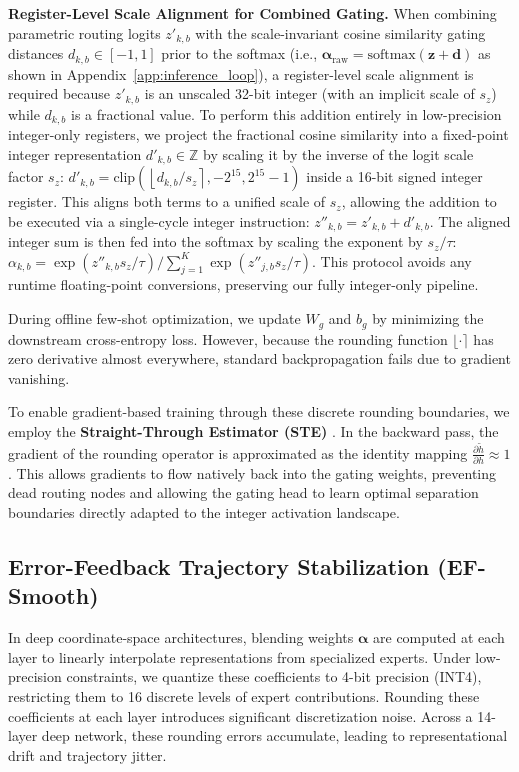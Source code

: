 \textbf{Register-Level Scale Alignment for Combined Gating.} When combining parametric routing logits $z'_{k, b}$ with the scale-invariant cosine similarity gating distances $d_{k, b} \in [-1, 1]$ prior to the softmax (i.e., $\boldsymbol{\alpha}_{\text{raw}} = \text{softmax}(\mathbf{z} + \mathbf{d})$ as shown in Appendix~\ref{app:inference_loop}), a register-level scale alignment is required because $z'_{k, b}$ is an unscaled 32-bit integer (with an implicit scale of $s_z$) while $d_{k, b}$ is a fractional value. To perform this addition entirely in low-precision integer-only registers, we project the fractional cosine similarity into a fixed-point integer representation $d'_{k, b} \in \mathbb{Z}$ by scaling it by the inverse of the logit scale factor $s_z$: $d'_{k, b} = \text{clip}\left(\left\lfloor d_{k, b} / s_z \right\rceil, -2^{15}, 2^{15}-1\right)$ inside a 16-bit signed integer register. This aligns both terms to a unified scale of $s_z$, allowing the addition to be executed via a single-cycle integer instruction: $z''_{k, b} = z'_{k, b} + d'_{k, b}$. The aligned integer sum is then fed into the softmax by scaling the exponent by $s_z/\tau$: $\alpha_{k, b} = \exp(z''_{k, b} s_z / \tau) / \sum_{j=1}^K \exp(z''_{j, b} s_z / \tau)$. This protocol avoids any runtime floating-point conversions, preserving our fully integer-only pipeline.

During offline few-shot optimization, we update $W_g$ and $b_g$ by minimizing the downstream cross-entropy loss. However, because the rounding function $\lfloor \cdot \rceil$ has zero derivative almost everywhere, standard backpropagation fails due to gradient vanishing.

To enable gradient-based training through these discrete rounding boundaries, we employ the \textbf{Straight-Through Estimator (STE)} \cite{bengio2013estimating}. In the backward pass, the gradient of the rounding operator is approximated as the identity mapping $\frac{\partial \tilde{h}}{\partial h} \approx 1$.
This allows gradients to flow natively back into the gating weights, preventing dead routing nodes and allowing the gating head to learn optimal separation boundaries directly adapted to the integer activation landscape.

\subsection{Error-Feedback Trajectory Stabilization (EF-Smooth)}
In deep coordinate-space architectures, blending weights $\boldsymbol{\alpha}$ are computed at each layer to linearly interpolate representations from specialized experts. Under low-precision constraints, we quantize these coefficients to 4-bit precision (INT4), restricting them to 16 discrete levels of expert contributions. Rounding these coefficients at each layer introduces significant discretization noise. Across a 14-layer deep network, these rounding errors accumulate, leading to representational drift and trajectory jitter.

